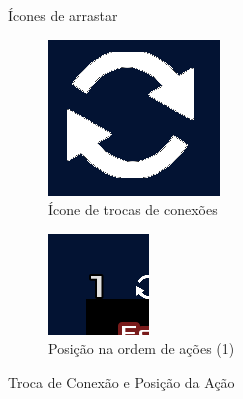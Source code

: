 \begin{figure}[H]
\begin{minipage}{.4\textwidth}
    \end{minipage}
    \caption{Ícones de arrastar}
\end{figure}

\begin{figure}[H]
    \centering
    \begin{subfigure}{0.4\textwidth}
        \centering
        \includegraphics[width=.7\textwidth]{../figuras/change_button.png}
        \caption{Ícone de trocas de conexões}
    \end{subfigure}
    \begin{subfigure}{0.4\textwidth}
        \centering
        \includegraphics[width=.7\textwidth]{../figuras/numero_posicao.png}
        \caption{Posição na ordem de ações (1)}
    \end{subfigure}  
    \caption{Troca de Conexão e Posição da Ação}
\end{figure}


